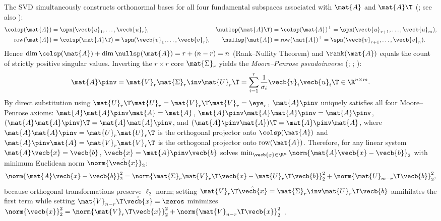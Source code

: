 \documentclass[../../../../master.tex]{subfiles}
\begin{document}
The SVD simultaneously constructs orthonormal bases for all four fundamental subspaces associated with $\mat{A}$ and $\mat{A}\T$ (; see also ):
\begin{equation}
\label{eq:svd:subspaces}
\begin{aligned}
  \colsp(\mat{A}) &= \spn(\vecb{u}_1,\dots,\vecb{u}_r), &
  \nullsp(\mat{A}\T) &= \colsp(\mat{A})^\perp = \spn(\vecb{u}_{r+1},\dots,\vecb{u}_m), \\
  \mathrm{row}(\mat{A}) &= \colsp(\mat{A}\T) = \spn(\vecb{v}_1,\dots,\vecb{v}_r), &
  \nullsp(\mat{A}) &= \mathrm{row}(\mat{A})^\perp = \spn(\vecb{v}_{r+1},\dots,\vecb{v}_n).
\end{aligned}
\end{equation}
Hence $\dim\colsp(\mat{A}) + \dim\nullsp(\mat{A}) = r + (n-r) = n$ (Rank--Nullity Theorem) and $\rank(\mat{A})$ equals the count of strictly positive singular values. Inverting the $r \times r$ core $\mat{\Sigma}_r$ yields the \emph{Moore--Penrose pseudoinverse} (; ; ):
\begin{equation}
\label{eq:svd:pinv}
  \mat{A}\pinv = \mat{V}_r \mat{\Sigma}_r\inv \mat{U}_r\T = \sum_{i=1}^r \frac{1}{\sigma_i} \vecb{v}_i \vecb{u}_i\T \in \R^{n \times m}.
\end{equation}
By direct substitution using $\mat{U}_r\T\mat{U}_r = \mat{V}_r\T\mat{V}_r = \eye_r$, $\mat{A}\pinv$ uniquely satisfies all four Moore--Penrose axioms: $\mat{A}\mat{A}\pinv\mat{A} = \mat{A}$, $\mat{A}\pinv\mat{A}\mat{A}\pinv = \mat{A}\pinv$, $(\mat{A}\mat{A}\pinv)\T = \mat{A}\mat{A}\pinv$, and $(\mat{A}\pinv\mat{A})\T = \mat{A}\pinv\mat{A}$, where $\mat{A}\mat{A}\pinv = \mat{U}_r\mat{U}_r\T$ is the orthogonal projector onto $\colsp(\mat{A})$ and $\mat{A}\pinv\mat{A} = \mat{V}_r\mat{V}_r\T$ is the orthogonal projector onto $\mathrm{row}(\mat{A})$. Therefore, for any linear system $\mat{A}\vecb{x} = \vecb{b}$, $\hat{\vecb{x}} = \mat{A}\pinv \vecb{b}$ solves $\min_{\vecb{x} \in \R^n} \norm{\mat{A}\vecb{x} - \vecb{b}}_2$ with minimum Euclidean norm $\norm{\hat{\vecb{x}}}_2$:
\[
  \norm{\mat{A}\vecb{x} - \vecb{b}}_2^2
  = \norm{\mat{\Sigma}_r \mat{V}_r\T \vecb{x} - \mat{U}_r\T \vecb{b}}_2^2 + \norm{\mat{U}_{m-r}\T \vecb{b}}_2^2,
\]
because orthogonal transformations preserve $\ell_2$ norm; setting $\mat{V}_r\T \hat{\vecb{x}} = \mat{\Sigma}_r\inv \mat{U}_r\T \vecb{b}$ annihilates the first term while setting $\mat{V}_{n-r}\T \hat{\vecb{x}} = \zeros$ minimizes $\norm{\vecb{x}}_2^2 = \norm{\mat{V}_r\T\vecb{x}}_2^2 + \norm{\mat{V}_{n-r}\T\vecb{x}}_2^2$  .
\end{document}
